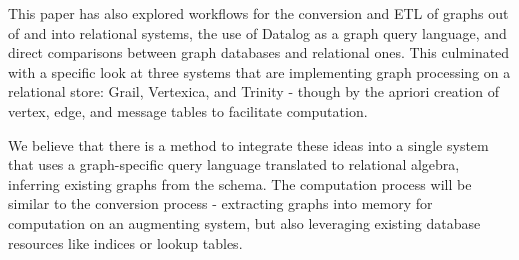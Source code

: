 \documentclass[11pt,letterpaper]{article}
\begin{document}
This paper has also explored workflows for the conversion and ETL of graphs out of and into relational systems, the use of Datalog as a graph query language, and direct comparisons between graph databases and relational ones. This culminated with a specific look at three systems that are implementing graph processing on a relational store: Grail, Vertexica, and Trinity - though by the apriori creation of vertex, edge, and message tables to facilitate computation.

We believe that there is a method to integrate these ideas into a single system that uses a graph-specific query language translated to relational algebra, inferring existing graphs from the schema. The computation process will be similar to the conversion process - extracting graphs into memory for computation on an augmenting system, but also leveraging existing database resources like indices or lookup tables.








\clearpage
\end{document}
